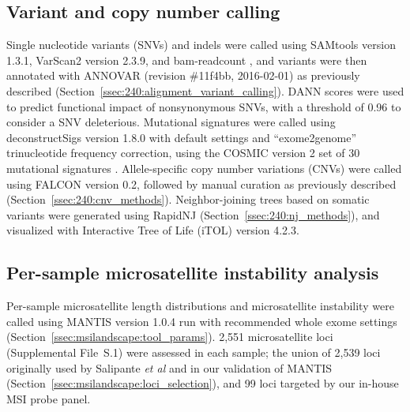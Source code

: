\subsection{Variant and copy number calling}
Single nucleotide variants (SNVs) and indels were called using SAMtools \cite{samtools} version 1.3.1, VarScan2 \cite{varscan2} version 2.3.9, and bam-readcount \cite{bamreadcount}, and variants were then annotated with ANNOVAR \cite{annovar} (revision \#11f4bb, 2016-02-01) as previously described \cite{chen2019} (Section~\ref{ssec:240:alignment_variant_calling}). DANN scores \cite{quang2015} were used to predict functional impact of nonsynonymous SNVs, with a threshold of 0.96 to consider a SNV deleterious. Mutational signatures were called using deconstructSigs \cite{rosenthal16} version 1.8.0 with default settings and ``exome2genome'' trinucleotide frequency correction, using the COSMIC version 2 set of 30 mutational signatures \cite{cosmic_ms}. Allele-specific copy number variations (CNVs) were called using FALCON \cite{falcon} version 0.2, followed by manual curation as previously described \cite{chen2019} (Section~\ref{ssec:240:cnv_methods}). Neighbor-joining trees based on somatic variants were generated using RapidNJ \cite{simonsen08} (Section~\ref{ssec:240:nj_methods}), and visualized with Interactive Tree of Life \cite{letunic16} (iTOL) version 4.2.3.

\subsection{Per-sample microsatellite instability analysis}
Per-sample microsatellite length distributions and microsatellite instability were called using MANTIS \cite{kautto17} version 1.0.4 run with recommended whole exome settings (Section~\ref{ssec:msilandscape:tool_params}). 2,551 microsatellite loci (Supplemental File~S\thechapter{}.1) were assessed in each sample; the union of 2,539 loci originally used by Salipante \textit{et al} \cite{salipante2014} and in our validation of MANTIS (Section~\ref{ssec:msilandscape:loci_selection}), and 99 loci targeted by our in-house MSI probe panel.

